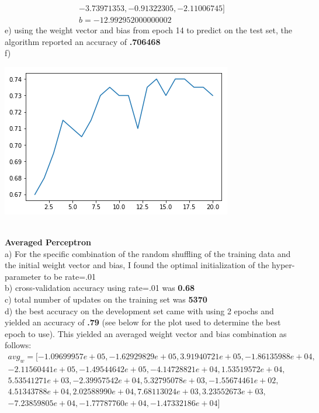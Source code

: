 \documentclass[11pt,a4paper]{article}
\begin{document}
\begin{enumerate}
\begin{gather}
        -3.73971353,  -0.91322305,  -2.11006745] \\
			b = -12.992952000000002
			\end{gather}
			e) using the weight vector and bias from epoch 14 to predict on the test set, the algorithm reported an accuracy of \textbf{.706468} \\
			f)
			\begin{center}
				\includegraphics[width=0.7\linewidth]{margin_plot}
			\end{center}
			~\\
			\textbf{Averaged Perceptron}    \\
			a) For the specific combination of the random shuffling of the training data and the initial weight vector and bias, I found the optimal initialization of the hyper-parameter to be rate=.01  \\
			b) cross-validation accuracy using rate=.01 was \textbf{0.68}\\
			c) total number of updates on the training set was \textbf{5370}\\
			d) the best accuracy on the development set came with using 2 epochs and yielded an accuracy of \textbf{.79} (see below for the plot used to determine the best epoch to use). This yielded an averaged weight vector and bias combination as follows:\\
			\begin{gather}
			avg_w = [-1.09699957e+05, -1.62929829e+05,  3.91940721e+05, -1.86135988e+04,\\
       -2.11560441e+05, -1.49544642e+05, -4.14728821e+04,  1.53519572e+04,\\
        5.53541271e+03, -2.39957542e+04,  5.32795078e+03, -1.55674461e+02,\\
        4.51343788e+04,  2.02588990e+04,  7.68113024e+03,  3.23552673e+03,\\
       -7.23859805e+04, -1.77787760e+04, -1.47332186e+04] \\

\end{gather}
\end{enumerate}
\end{document}
